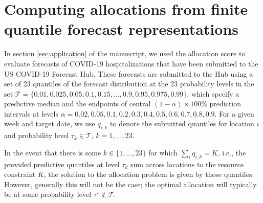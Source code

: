 \documentclass{article}
\begin{document}
\section{Computing allocations from finite quantile forecast representations}

In section \ref{sec:application} of the manuscript, we used the allocation score to evaluate forecasts of COVID-19 hospitalizations that have been submitted to the US COVID-19 Forecast Hub. These forecasts are submitted to the Hub using a set of 23 quantiles of the forecast distribution at the 23 probability levels in the set $\mathcal{T} = \{0.01, 0.025, 0.05, 0.1, 0.15, \ldots, \allowbreak 0.9, 0.95, 0.975, 0.99\}$, which specify a predictive median and the endpoints of central $(1 - \alpha) \times 100\%$ prediction intervals at levels $\alpha = 0.02, 0.05, 0.1, 0.2, \allowbreak 0.3, 0.4, 0.5, 0.6, \allowbreak 0.7, 0.8, 0.9$. For a given week and target date, we use $q_{i,k}$ to denote the submitted quantiles for location $i$ and probability level $\tau_k \in \mathcal{T}$, $k = 1, \ldots, 23$.

In the event that there is some $k \in \{1, \ldots, 23\}$ for which $\sum_i q_{i,k} = K$, i.e., the provided predictive quantiles at level $\tau_k$ sum across locations to the resource constraint $K$, the solution to the allocation problem is given by those quantiles. However, generally this will not be the case; the optimal allocation will typically be at some probability level $\tau^\star \notin \mathcal{T}$.
\end{document}
